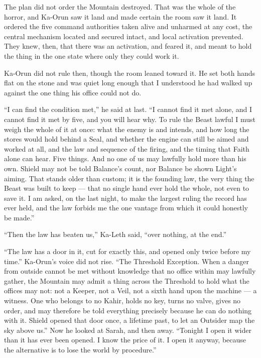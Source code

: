 The plan did not order the Mountain destroyed. That was the whole of the horror, and Ka-Orun saw it land and made certain the room saw it land. It ordered the five command authorities taken alive and unharmed at any cost, the central mechanism located and secured intact, and local activation prevented. They knew, then, that there was an activation, and feared it, and meant to hold the thing in the one state where only they could work it.\par

\ornament

Ka-Orun did not rule then, though the room leaned toward it. He set both hands flat on the stone and was quiet long enough that I understood he had walked up against the one thing his office could not do.\par

``I can find the condition met,'' he said at last. ``I cannot find it met alone, and I cannot find it met by five, and you will hear why. To rule the Beast lawful I must weigh the whole of it at once: what the enemy is and intends, and how long the stores would hold behind a Seal, and whether the engine can still be aimed and worked at all, and the law and sequence of the firing, and the timing that Faith alone can hear. Five things. And no one of us may lawfully hold more than his own. Shield may not be told Balance's count, nor Balance be shown Light's aiming. That stands older than custom; it is the founding law, the very thing the Beast was built to keep --- that no single hand ever hold the whole, not even to save it. I am asked, on the last night, to make the largest ruling the record has ever held, and the law forbids me the one vantage from which it could honestly be made.''\par

``Then the law has beaten us,'' Ka-Leth said, ``over nothing, at the end.''\par

``The law has a door in it, cut for exactly this, and opened only twice before my time.'' Ka-Orun's voice did not rise. ``The Threshold Exception. When a danger from outside cannot be met without knowledge that no office within may lawfully gather, the Mountain may admit a thing across the Threshold to hold what the offices may not: not a Keeper, not a Veil, not a sixth hand upon the machine --- a witness. One who belongs to no Kahir, holds no key, turns no valve, gives no order, and may therefore be told everything precisely because he can do nothing with it. Shield opened that door once, a lifetime past, to let an Outsider map the sky above us.'' Now he looked at Sarah, and then away. ``Tonight I open it wider than it has ever been opened. I know the price of it. I open it anyway, because the alternative is to lose the world by procedure.''\par

